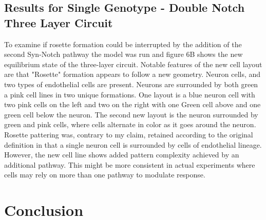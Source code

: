\documentclass[12pt]{ifacconf}
\begin{document}
\subsection{Results for Single Genotype - Double Notch Three Layer Circuit} 

To examine if rosette formation could be interrupted by the addition of the second Syn-Notch pathway the model was run and figure 6B shows the new equilibrium state of the three-layer circuit. Notable features of the new cell layout are that "Rosette" formation appears to follow a new geometry. Neuron cells, and two types of endothelial cells are present. Neurons are surrounded by both green a pink cell lines in two unique formations. One layout is a blue neuron cell with two pink cells on the left and two on the right with one Green cell above and one green cell below the neuron. The second new layout is the neuron surrounded by green and pink cells, where cells alternate in color as it goes around the neuron. Rosette pattering was, contrary to my claim, retained according to the original definition in that a single neuron cell is surrounded by cells of endothelial lineage. However, the new cell line shows added pattern complexity achieved by an additional pathway. This might be more consistent in actual experiments where cells may rely on more than one pathway to modulate response.





\section{Conclusion}
\end{document}
